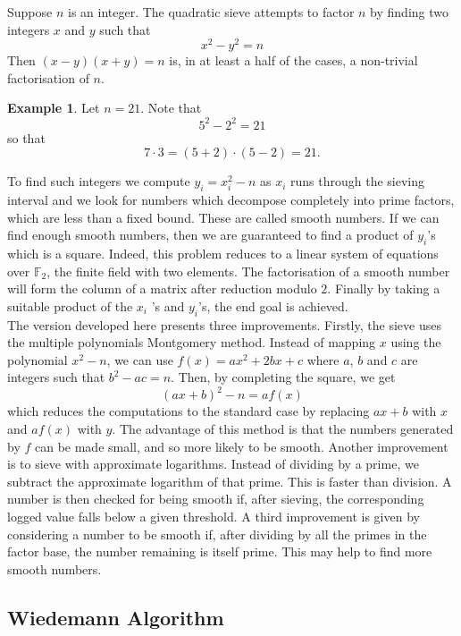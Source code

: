 \documentclass{amsart}
\theoremstyle{definition}
\newtheorem{example}[theorem]{Example}
\theoremstyle{remark}
\numberwithin{equation}{section}
\begin{document}
Suppose $n$ is an integer. The quadratic sieve attempts to factor $n$ by finding two integers $x$ and $y$ such that $$x ^ 2 - y ^ 2 = n$$ Then $(x - y)(x + y) = n$ is, in at least a half of the cases, a non-trivial factorisation of $n$. 

\begin{example}
Let $n = 21$. Note that $$ 5 ^ 2 - 2 ^ 2 = 21$$ so that $$ 7 \cdot 3 = (5 + 2)\cdot (5 - 2) = 21.$$
\end{example}

To find such integers we compute $y_i = x_i ^ 2 - n$ as $x_i$ runs through the sieving interval and we look for numbers which decompose completely into prime factors, which are less than a fixed bound. These are called smooth numbers. If we can find enough smooth numbers, then we are guaranteed to find a product of $y_i$'s which is a square. Indeed, this problem reduces to a linear system of equations over $\mathbb{F}_2$, the finite field with two elements. The factorisation of a smooth number will form the column of a matrix after reduction modulo $2$. Finally by taking a suitable product of the $x_i$ 's and $y_i$'s, the end goal is achieved. \\

The version developed here presents three improvements. Firstly, the sieve uses the multiple polynomials Montgomery method. Instead of mapping $x$ using the polynomial $x^2 - n$, we can use $f (x) = ax^2 + 2bx + c$ where $a$, $b$ and $c$ are integers such that $b ^ 2 - ac = n$. Then, by completing the square, we get $$(ax + b) ^ 2 - n =  af(x)$$ which reduces the computations to the standard case by replacing $ax +b$ with $x$ and $a f(x)$ with $y$. The advantage of this method is that the numbers generated by $f$ can be made small, and so more likely to be smooth. Another improvement is to sieve with approximate logarithms. Instead of dividing by a prime, we subtract the approximate logarithm of that prime. This is faster than division. A number is then checked for being smooth if, after sieving, the corresponding logged value falls below a given threshold. A third improvement is given by considering a number to be smooth if, after dividing by all the primes in the factor base, the number remaining is itself prime. This may help to find more smooth numbers.

\subsection*{Wiedemann Algorithm}
\end{document}
